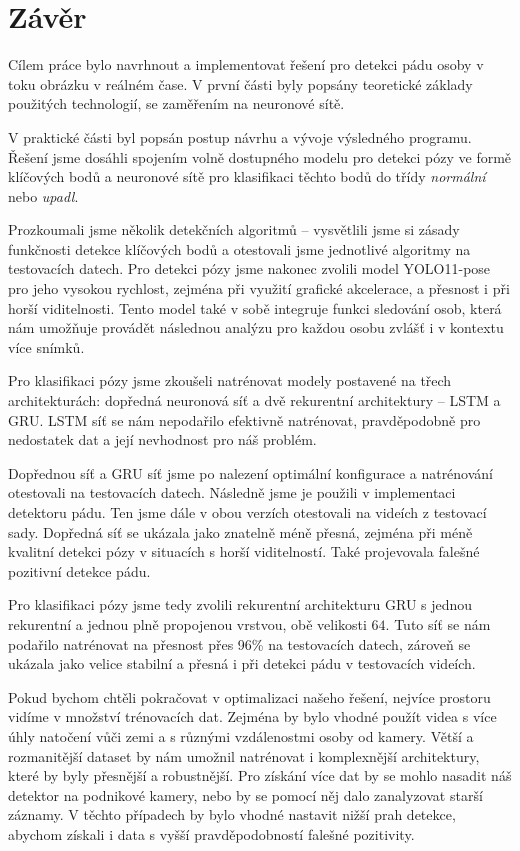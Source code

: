 \chapter{Závěr}
\label{chap:Conclusion}

Cílem práce bylo navrhnout a implementovat řešení pro detekci pádu osoby v toku
obrázku v reálném čase. V první části byly popsány teoretické základy použitých
technologií, se zaměřením na neuronové sítě.

V praktické části byl popsán postup návrhu a vývoje výsledného programu. Řešení
jsme dosáhli spojením volně dostupného modelu pro detekci pózy ve formě
klíčových bodů a neuronové sítě pro klasifikaci těchto bodů do třídy
\textit{normální} nebo \textit{upadl}.

Prozkoumali jsme několik detekčních algoritmů – vysvětlili jsme si zásady
funkčnosti detekce klíčových bodů a otestovali jsme jednotlivé algoritmy na
testovacích datech. Pro detekci pózy jsme nakonec zvolili model YOLO11-pose pro
jeho vysokou rychlost, zejména při využití grafické akcelerace, a přesnost i
při horší viditelnosti. Tento model také v sobě integruje funkci sledování
osob, která nám umožňuje provádět následnou analýzu pro každou osobu zvlášť i v
kontextu více snímků.

Pro klasifikaci pózy jsme zkoušeli natrénovat modely postavené na třech  
architekturách: dopředná neuronová síť a dvě rekurentní architektury – LSTM a
GRU. LSTM síť se nám nepodařilo efektivně natrénovat, pravděpodobně pro
nedostatek dat a její nevhodnost pro náš problém.

Dopřednou síť a GRU síť jsme po nalezení optimální konfigurace a natrénování
otestovali na testovacích datech. Následně jsme je použili v implementaci
detektoru pádu. Ten jsme dále v obou verzích otestovali na videích z testovací
sady. Dopředná síť se ukázala jako znatelně méně přesná, zejména při méně
kvalitní detekci pózy v situacích s horší viditelností. Také projevovala
falešné pozitivní detekce pádu.

Pro klasifikaci pózy jsme tedy zvolili rekurentní architekturu GRU s jednou
rekurentní a jednou plně propojenou vrstvou, obě velikosti $64$. Tuto síť se
nám podařilo natrénovat na přesnost přes 96\% na testovacích datech, zároveň se
ukázala jako velice stabilní a přesná i při detekci pádu v testovacích videích.

Pokud bychom chtěli pokračovat v optimalizaci našeho řešení, nejvíce
prostoru vidíme v množství trénovacích dat. Zejména by bylo vhodné použít videa s
více úhly natočení vůči zemi a s různými vzdálenostmi osoby od kamery. Větší a
rozmanitější dataset by nám umožnil natrénovat i komplexnější architektury,
které by byly přesnější a robustnější. Pro získání více dat by se mohlo nasadit
náš detektor na podnikové kamery, nebo by se pomocí něj dalo zanalyzovat starší
záznamy. V těchto případech by bylo vhodné nastavit nižší prah detekce, abychom
získali i data s vyšší pravděpodobností falešné pozitivity.


